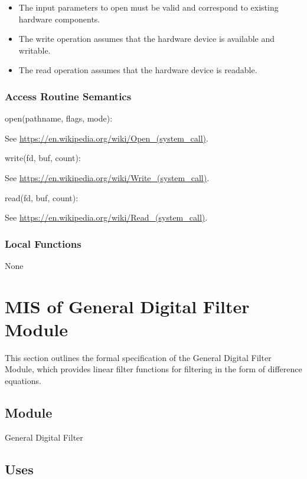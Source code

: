 \documentclass[12pt, titlepage]{article}
\begin{document}
\begin{itemize}
\item The input parameters to open must be valid and correspond to existing
hardware components.
\item The write operation assumes that the hardware device is available and
writable.
\item The read operation assumes that the hardware device is readable.
\end{itemize}

\subsubsection{Access Routine Semantics}

\noindent open(pathname, flags, mode):

See \url{https://en.wikipedia.org/wiki/Open_(system_call)}.

\noindent write(fd, buf, count):

See \url{https://en.wikipedia.org/wiki/Write_(system_call)}.

\noindent read(fd, buf, count):

See \url{https://en.wikipedia.org/wiki/Read_(system_call)}.

\subsubsection{Local Functions}

None

\newpage

\section{MIS of General Digital Filter Module} \label{MIS_GDF}

This section outlines the formal specification of the General Digital Filter
Module, which provides linear filter functions for filtering in the form of
difference equations.

\subsection{Module}

General Digital Filter

\subsection{Uses}
\end{document}
